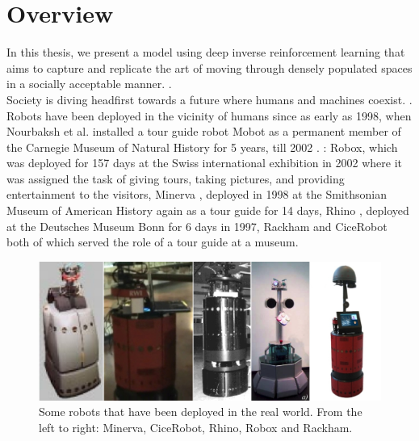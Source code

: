 \label{ch:introduction}
\section{Overview}
In this thesis, we present a model using deep inverse reinforcement learning that aims to capture and replicate the art of moving through densely populated spaces in a socially acceptable manner. .\\
Society is diving headfirst towards a future where humans and machines coexist. . Robots have been deployed in the vicinity of humans since as early as 1998, when Nourbaksh et al. installed a tour guide robot Mobot as a permanent member of the Carnegie Museum of Natural History for 5 years, till 2002 \cite{Nourbaksh2003Movot}. : Robox, \cite{siciliano_robox_2003} which was deployed for 157 days at the Swiss international exhibition in 2002 where it was assigned the task of giving tours, taking pictures, and providing entertainment to the visitors, Minerva \cite{minerva_thrun_2000}, deployed in 1998 at the Smithsonian Museum of American History again as a tour guide for 14 days, Rhino \cite{fox_dynamic_1997}, deployed at the Deutsches Museum Bonn for 6 days in 1997, Rackham \cite{rackham_clodic_2006} and CiceRobot \cite{chella_perception_2009} both of which served the role of a tour guide at a museum.\\
\vspace{3cm}
\begin{figure}
	\label{fig:real-world-robots}
	\centering
	\includegraphics[width=\linewidth]{figures/minerva_cice_rhino_robox_rackham.jpg}
	\caption{Some robots that have been deployed in the real world. From the left to right: Minerva, CiceRobot, Rhino, Robox and Rackham.}
\end{figure}

